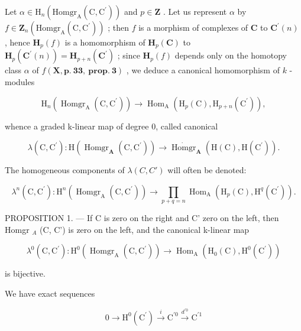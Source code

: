 Let \(\alpha\in\mathrm{H}_{n}(\mathrm{Homgr}_{\mathrm{A}}(\mathrm{C},\mathrm{C}^{\prime}))\) and \(p\in\mathbf{Z}\) . Let us represent \(\alpha\) by \(f\in\mathbf{Z}_{n}(\mathrm{Homgr}_{\mathrm{A}}(\mathrm{C},\mathrm{C}^{\prime}))\) ; then \(f\) is a morphism of complexes of \(\mathbf{C}\) to \(\mathbf{C}^{\prime}(n)\) , hence \(\mathbf{H}_{p}(f)\) is a homomorphism of \(\mathbf{H}_{p}(\mathbf{C})\) to \(\mathbf{H}_{p}(\mathbf{C}^{\prime}(n))=\mathbf{H}_{p+n}(\mathbf{C}^{\prime})\) ; since \(\mathbf{H}_{p}(f)\) depends only on the homotopy class \(\alpha\) of \(f(\mathbf{X},\mathbf{p.~33,~prop.~3})\) , we deduce a canonical homomorphism of \(k\) -modules

\[
\mathrm{H} _ {n} \left(\operatorname{Homgr} _ {\mathrm{A}} \left(\mathrm{C}, \mathrm{C} ^ {\prime}\right)\right)\rightarrow \operatorname{Hom} _ {\mathrm{A}} \left(\mathrm{H} _ {p} (\mathrm{C}), \mathrm{H} _ {p + n} \left(\mathrm{C} ^ {\prime}\right)\right),
\]

whence a graded k-linear map of degree 0, called canonical

\[
\lambda (\mathrm{C}, \mathrm{C} ^ {\prime}): \mathrm{H} (\operatorname{Homgr} _ {\mathbf {A}} (\mathrm{C}, \mathrm{C} ^ {\prime})) \rightarrow \dot {\operatorname{Homgr}} _ {\mathbf {A}} (\mathrm{H} (\mathrm{C}), \mathrm{H} (\mathrm{C} ^ {\prime})).
\]

The homogeneous components of \(\lambda(C, C')\) will often be denoted:

\[
\lambda^ {n} (\mathrm{C}, \mathrm{C} ^ {\prime}): \mathrm{H} ^ {n} \left(\operatorname{Homgr} _ {\mathrm{A}} \left(\mathrm{C}, \mathrm{C} ^ {\prime}\right)\right)\rightarrow \prod_ {p + q = n} \operatorname{Hom} _ {\mathrm{A}} \left(\mathrm{H} _ {p} (\mathrm{C}), \mathrm{H} ^ {q} \left(\mathrm{C} ^ {\prime}\right)\right).
\]

PROPOSITION 1. --- If C is zero on the right and C' zero on the left, then Homgr \(_{A}\) (C, C') is zero on the left, and the canonical k-linear map

\[
\lambda^ {0} (\mathrm{C}, \mathrm{C} ^ {\prime}): \mathrm{H} ^ {0} \left(\operatorname{Homgr} _ {\mathrm{A}} (\mathrm{C}, \mathrm{C} ^ {\prime})\right)\rightarrow \operatorname{Hom} _ {\mathrm{A}} \left(\mathrm{H} _ {0} (\mathrm{C}), \mathrm{H} ^ {0} \left(\mathrm{C} ^ {\prime}\right)\right)
\]

is bijective.

We have exact sequences

\[
0 \longrightarrow \mathrm{H} ^ {0} (\mathrm{C} ^ {\prime}) \stackrel {i} {\longrightarrow} \mathrm{C} ^ {\prime 0} \stackrel {d ^ {\prime 0}} {\longrightarrow} \mathrm{C} ^ {\prime 1}
\]

